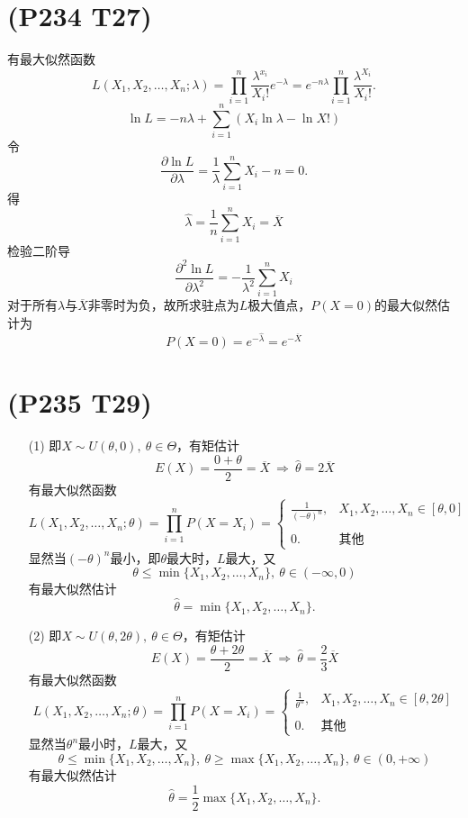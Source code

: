 \documentclass{article}
\begin{document}
\section{(P234 T27)}  %
有最大似然函数
\[
    L(X_1,X_2,\ldots,X_n ; \lambda)
    = \prod_{i=1}^{n} \frac{\lambda^{x_i}}{X_i !} e^{-\lambda}
    = e^{-n\lambda} \prod_{i=1}^{n} \frac{\lambda^{X_i}}{X_i !}.
\]
\[
    \ln L 
    = -n\lambda + \sum\limits_{i=1}^{n} \left(X_i \ln \lambda - \ln X! \right)    
\]
令
\[
    \frac{\partial \ln L}{\partial \lambda} 
    = \frac{1}{\lambda} \sum\limits_{i=1}^{n} X_i - n 
    = 0. 
\]
得
\[
    \widehat{\lambda} = \frac{1}{n}\sum\limits_{i=1}^{n} X_i = \overline{X}  
\]
检验二阶导
\[
    \frac{\partial^2 \ln L}{\partial \lambda^2} 
    = - \frac{1}{\lambda^2} \sum\limits_{i=1}^{n} X_i 
\]
对于所有$\lambda$与$\overline{X}$非零时为负，故所求驻点为$L$极大值点，$P(X=0)$的最大似然估计为
\[
    P(X = 0) = e^{-\widehat{\lambda}} = e^{- \overline{X}}
\]

\section{(P235 T29)}    %
\begin{enumerate}
    \item [(1)]即$X \sim U(\theta, 0),\ \theta \in \Theta$，有矩估计
    \[
        E(X)
        = \frac{0 + \theta}{2}
        = \overline{X}
        \ \Rightarrow\ 
        \widehat{\theta}
        = 2 \overline{X}    
    \]
    有最大似然函数
    \[
        L(X_1,X_2,\ldots,X_n ; \theta)
        = \prod_{i=1}^{n} P(X = X_i)
        = 
        \begin{cases}
            \displaystyle{\frac{1}{{(-\theta)}^{n}}}, & X_1, X_2, \ldots, X_n \in [\theta, 0]\\
            \\
            0. & \mbox{其他}
        \end{cases}
    \]
    显然当${(-\theta)}^{n}$最小，即$\theta$最大时，$L$最大，又
    \[
        \theta \leq \min\{X_1, X_2, \ldots, X_n\},\ 
        \theta \in (-\infty, 0)
    \]
    有最大似然估计
    \[
        \widehat{\theta} = \min\{X_1, X_2, \ldots, X_n\} .
    \]
    \item [(2)]即$X \sim U(\theta, 2\theta),\ \theta \in \Theta$，有矩估计
    \[
        E(X)
        = \frac{\theta + 2\theta}{2}
        = \overline{X}
        \ \Rightarrow\ 
        \widehat{\theta}
        = \frac{2}{3} \overline{X}    
    \]
    有最大似然函数
    \[
        L(X_1,X_2,\ldots,X_n ; \theta)
        = \prod_{i=1}^{n} P(X = X_i)
        = 
        \begin{cases}
            \displaystyle{\frac{1}{\theta^{n}}}, & X_1, X_2, \ldots, X_n \in [\theta, 2\theta]\\
            \\
            0. & \mbox{其他}
        \end{cases}
    \]
    显然当${\theta}^{n}$最小时，$L$最大，又
    \[
        \theta \leq \min\{X_1, X_2, \ldots, X_n\},\ 
        \theta \geq \max\{X_1, X_2, \ldots, X_n\},\ 
        \theta \in (0, +\infty)
    \]
    有最大似然估计
    \[
        \widehat{\theta} =\frac{1}{2} \max\{X_1, X_2, \ldots, X_n\} .
    \]
\end{enumerate}
\end{document}
